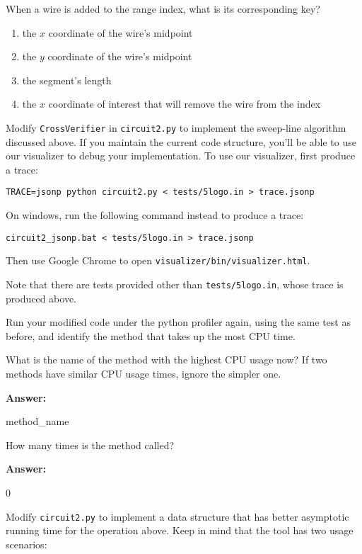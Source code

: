 \documentclass[12pt,twoside]{article}
\newcommand{\answer}{
 \par\medskip
 \textbf{Answer:}
}
\newcommand{\answerIIj}{ \answer
method\_name
}
\newcommand{\answerIIk}{ \answer
0
}
\begin{document}
\begin{problems}
\begin{problemparts}
\problempart {} When a wire is added to the range index, what is its
corresponding key?
\begin{enumerate}
  \item the $x$ coordinate of the wire's midpoint
  \item the $y$ coordinate of the wire's midpoint
  \item the segment's length
  \item the $x$ coordinate of interest that will remove the wire from the index
\end{enumerate}

\end{problemparts}

Modify \texttt{CrossVerifier} in \texttt{circuit2.py} to implement the sweep-line
algorithm discussed above. If you maintain the current code structure, you’ll be able
to use our visualizer to debug your implementation. To use our visualizer, first
produce a trace:

\texttt{TRACE=jsonp python circuit2.py < tests/5logo.in > trace.jsonp}

On windows, run the following command instead to produce a trace:

\texttt{circuit2\_jsonp.bat < tests/5logo.in > trace.jsonp}

Then use Google Chrome to open \texttt{visualizer/bin/visualizer.html}.

Note that there are tests provided other than \texttt{tests/5logo.in}, whose trace
is produced above.

\begin{problemparts}

\problempart {} Run your modified code under the python profiler again, using
the same test as before, and identify the method that takes up the most CPU time.

What is the name of the method with the highest CPU usage now? If two methods have
similar CPU usage times, ignore the simpler one.
\answerIIj

\problempart {} How many times is the method called?
\answerIIk

\problempart {} Modify \texttt{circuit2.py} to implement a data structure
that has better asymptotic running time for the operation above. Keep in mind that
the tool has two usage scenarios:


\end{problemparts}
\end{problems}
\end{document}
